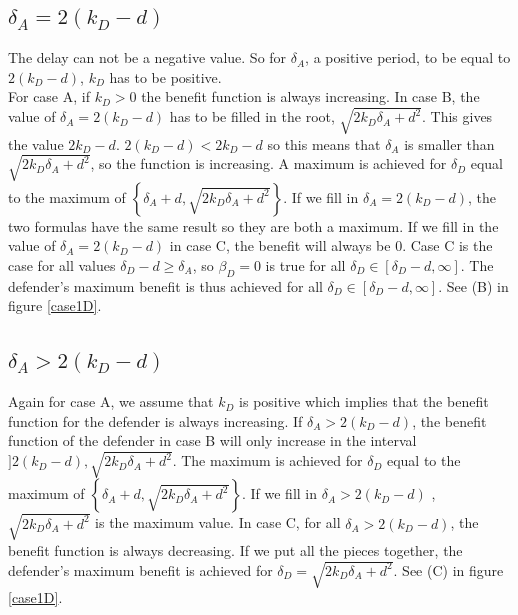 \subsection*{$\delta_{A} = 2(k_{D} - d)$}
The delay can not be a negative value. So for $\delta_{A}$, a positive period, to be equal to  $2(k_{D} - d)$, $k_{D}$ has to be positive. \\
For case A, if $k_{D}>0$ the benefit function is always increasing. In case B, the value of $\delta_{A} =2(k_{D} - d)$ has to be filled in the root, $\sqrt{2k_{D}\delta_{A} + d^{2}}$. This gives the value $2k_{D}-d$. $2(k_{D}-d) < 2k_{D}-d$ so this means that $\delta_{A}$ is smaller than $ \sqrt{2k_{D}\delta_{A} + d^{2}}$, so the function is increasing. A maximum is achieved for $\delta_{D}$ equal to the maximum of $\left\lbrace \delta_{A}+d, \sqrt{2k_{D}\delta_{A} + d^{2}}\right\rbrace $. If we fill in $\delta_{A} = 2(k_{D} - d)$, the two formulas have the same result so they are both a maximum.
If we fill in the value of $\delta_{A} = 2(k_{D} - d)$ in case C, the benefit will always be 0. Case C is the case for all values $\delta_{D} -d \geq \delta_{A}$, so $\beta_{D}=0$ is true for all $\delta_{D} \in [\delta_{D}-d, \infty]$.
The defender's maximum benefit is thus achieved for all $\delta_{D} \in [\delta_{D}-d, \infty]$. See (B) in figure \ref{case1D}. 


\subsection*{$\delta_{A} > 2(k_{D} - d)$ }
Again for case A, we assume that $k_{D}$ is positive which implies that the benefit function for the defender is always increasing. If $\delta_{A} > 2(k_{D} - d)$, the benefit function of the defender in case B will only increase in the interval $]2(k_{D} - d), \sqrt{2k_{D}\delta_{A} + d^{2}}$. The maximum is achieved for $\delta_{D}$ equal to the maximum of $\left\lbrace \delta_{A}+d, \sqrt{2k_{D}\delta_{A} + d^{2}}\right\rbrace $. If we fill in $\delta_{A} > 2(k_{D} - d)$ , $\sqrt{2k_{D}\delta_{A} + d^{2}}$ is the maximum value. In case C, for all $\delta_{A} > 2(k_{D} - d)$, the benefit function is always decreasing. If we put all the pieces together, the defender's maximum benefit is achieved for $\delta_{D} = \sqrt{2k_{D}\delta_{A} + d^{2}}$. See (C) in figure \ref{case1D}.

